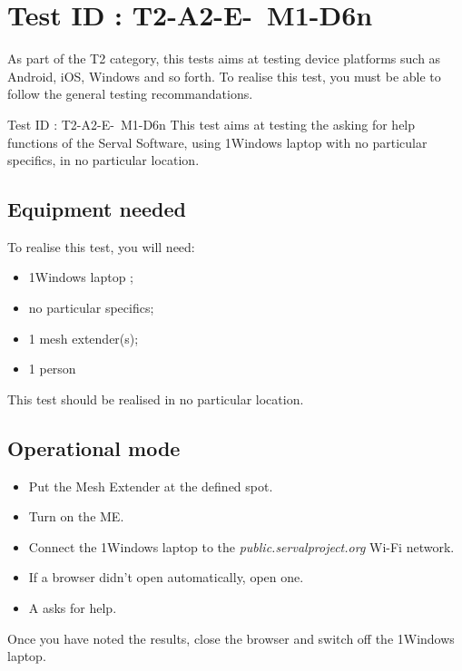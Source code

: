 \documentclass[oneside]{book}
\begin{document}
\section{Test ID : T2-A2-E- M1-D6n}
\begin{itshape}
As part of the T2 category, this tests aims at testing device platforms such as Android, iOS, Windows and so forth.
To realise this test, you must be able to follow the general testing recommandations.
\end{itshape}
\newline
Test ID : T2-A2-E- M1-D6n
 This test aims at testing the asking for help functions of the Serval Software, using 1Windows laptop with no particular specifics, in no particular location.
\subsection{Equipment needed} To realise this test, you will need:
\begin{itemize}
\item 1Windows laptop ;
\item no particular specifics;
\item 1 mesh extender(s);
\item 1 person
\end{itemize}
This test should be realised in no particular location.
\subsection{Operational mode} \begin{itemize}
\item Put the Mesh Extender at the defined spot.
\item Turn on the ME.
\item Connect the 1Windows laptop to the \emph{public.servalproject.org} Wi-Fi network.
\item If a browser didn't open automatically, open one.
\item A asks for help.
\end{itemize}
Once you have noted the results, close the browser and switch off the 1Windows laptop.
\end{document}
